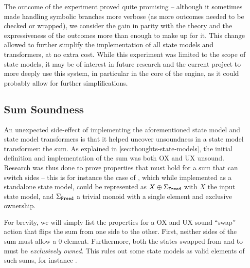 The outcome of the experiment proved quite promising -- although it sometimes made handling symbolic branches more verbose (as more outcomes needed to be checked or wrapped), we consider the gain in parity with the theory and the expressiveness of the outcomes more than enough to make up for it. This change allowed to further simplify the implementation of all state models and transformers, at no extra cost. While this experiment was limited to the scope of state models, it may be of interest in future research and the current project to more deeply use this system, in particular in the core of the engine, as it could probably allow for further simplifications.

\subsection{Sum Soundness}

An unexpected side-effect of implementing the aforementioned state model and state model transformers is that it helped uncover unsoundness in a state model transformer: the sum. As explained in \autoref{sec:thoughts-state-models}, the initial definition and implementation of the sum was both OX and UX unsound. Research was thus done to prove properties that must hold for a sum that can switch sides -- this is for instance the case of , which while implemented as a standalone state model, could be represented as $X \oplus \Sigma_{\texttt{Freed}}$ with $X$ the input state model, and $\Sigma_{\texttt{Freed}}$ a trivial monoid with a single  element and exclusive ownership.

For brevity, we will simply list the properties for a OX and UX-sound ``swap'' action that flips the sum from one side to the other. First, neither sides of the sum must allow a $0$ element. Furthermore, both the states swapped from and to must be \emph{exclusively owned}. This rules out some state models as valid elements of such sums, for instance .











